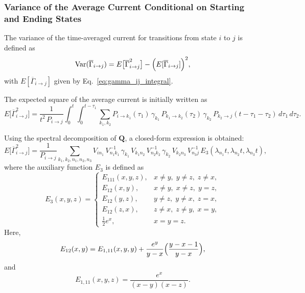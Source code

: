 \documentclass[pdflatex,sn-mathphys-num]{sn-jnl}%
\theoremstyle{thmstyleone}%
\theoremstyle{thmstyletwo}%
\theoremstyle{thmstylethree}%
\begin{document}
\subsubsection{Variance of the Average Current Conditional on Starting and Ending States}

The variance of the time-averaged current for transitions from state \(i\) to \(j\) is defined as
\begin{equation}
\mathrm{Var}(\overline{\Gamma}_{i\rightarrow j}) = E\bigl[\overline{\Gamma}_{i\rightarrow j}^2\bigr] - \Bigl(E[\overline{\Gamma}_{i\rightarrow j}]\Bigr)^2,
\label{eq:variance_gamma_short}
	\end{equation}
	with \(E[\overline{\Gamma}_{i\rightarrow j}]\) given by Eq.~\ref{eq:gamma_ij_integral}.

The expected square of the average current is initially written as
\begin{equation}
E\bigl[\overline{\Gamma}_{i\rightarrow j}^2\bigr] = \frac{1}{t^2\,P_{i\rightarrow j}} \int_0^t\int_0^{t-\tau_1} \sum_{k_1,k_2} P_{i\rightarrow k_1}(\tau_1)\,\gamma_{k_1}\,P_{k_1\rightarrow k_2}(\tau_2)\,\gamma_{k_2}\,P_{k_2\rightarrow j}(t-\tau_1-\tau_2)\,d\tau_1\,d\tau_2.
\label{eq:expected_square_integral_short}
\end{equation}

Using the spectral decomposition of \(\mathbf{Q}\), a closed-form expression is obtained:
	\begin{equation}
	E\bigl[\overline{\Gamma}_{i\rightarrow j}^2\bigr] = \frac{1}{P_{i\rightarrow j}} \sum_{k_1,k_2,n_1,n_2,n_3} V_{i n_1}\,V^{-1}_{n_1 k_1}\,\gamma_{k_1}\,V_{k_1 n_2}\,V^{-1}_{n_2 k_2}\,\gamma_{k_2}\,V_{k_2 n_3}\,V^{-1}_{n_3 j}\,E_3(\lambda_{n_1}t,\lambda_{n_2}t,\lambda_{n_3}t),
\label{eq:expected_square_closed_short}
\end{equation}
where the auxiliary function \(E_3\) is defined as
\begin{equation}
E_3(x,y,z)= 
\begin{cases}
E_{111}(x,y,z), & x\neq y,\; y\neq z,\; z\neq x,\\[1mm]
E_{12}(x,y),   & x\neq y,\; x\neq z,\; y=z,\\[1mm]
	E_{12}(y,z),   & y\neq z,\; y\neq x,\; z=x,\\[1mm]
	E_{12}(z,x),   & z\neq x,\; z\neq y,\; x=y,\\[1mm]
\frac{1}{2}e^x, & x=y=z.
\end{cases}
\label{eq:E3_short}
\end{equation}
Here,
	\begin{equation}
	E_{12}(x,y)= E_{1,11}(x,y,y) + \frac{e^y}{y-x}\Bigl(\frac{y-x-1}{y-x}\Bigr),
		\label{eq:E12_short}
		\end{equation}
		and
		\begin{equation}
		E_{1,11}(x,y,z)= \frac{e^x}{(x-y)(x-z)}.
	\label{eq:E1_11_short}
	\end{equation}
\end{document}
